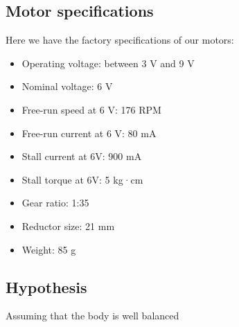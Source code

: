 \subsection{Motor specifications}

Here we have the factory specifications of our motors: 
\begin{itemize}
    \item Operating voltage: between 3 V and 9 V
    \item Nominal voltage: 6 V
    \item Free-run speed at 6 V: 176 RPM
    \item Free-run current at 6 V: 80 mA
    \item Stall current at 6V: 900 mA
    \item Stall torque at 6V: 5 kg·cm
    \item Gear ratio: 1:35
    \item Reductor size: 21 mm
    \item Weight: 85 g
\end{itemize}

\subsection{Hypothesis}
Assuming that the body is well balanced
